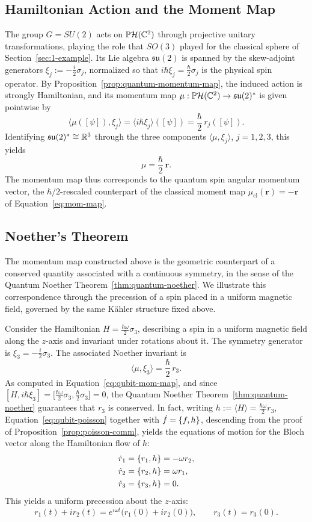 \subsection*{Hamiltonian Action and the Moment Map}

The group $G=SU(2)$ acts on $\PH(\C^2)$ through projective unitary transformations, playing the role that $SO(3)$ played for the classical sphere of Section~\ref{sec:1-example}. Its Lie algebra $\mathfrak{su}(2)$ is spanned by the skew-adjoint generators $\xi_j:=-\frac i2\sigma_j$, normalized so that $i\hbar\xi_j=\frac\hbar2\sigma_j$ is the physical spin operator. By Proposition~\ref{prop:quantum-momentum-map}, the induced action is strongly Hamiltonian, and its momentum map $\mu:\PH(\C^2)\to\mathfrak{su}(2)^*$ is given pointwise by
\[
\langle\mu([\psi]),\xi_j\rangle=\langle i\hbar\xi_j\rangle([\psi])=\frac\hbar2\,r_j([\psi]).
\]
Identifying $\mathfrak{su}(2)^*\cong\mathbb{R}^3$ through the three components $\langle\mu,\xi_j\rangle$, $j=1,2,3$, this yields
\begin{equation}
	\boxed{\mu=\frac\hbar2\,\mathbf r.} \label{eq:qubit-mom-map}
\end{equation}
The momentum map thus corresponds to the quantum spin angular momentum vector, the $\hbar/2$-rescaled counterpart of the classical moment map $\mu_{\mathrm{cl}}(\mathbf r)=-\mathbf r$ of Equation~\eqref{eq:mom-map}.

\subsection*{Noether's Theorem}

The momentum map constructed above is the geometric counterpart of a conserved quantity associated with a continuous symmetry, in the sense of the Quantum Noether Theorem~\ref{thm:quantum-noether}. We illustrate this correspondence through the precession of a spin placed in a uniform magnetic field, governed by the same Kähler structure fixed above.

Consider the Hamiltonian $H=\frac{\hbar\omega}2\sigma_3$, describing a spin in a uniform magnetic field along the $z$-axis and invariant under rotations about it. The symmetry generator is $\xi_3=-\frac i2\sigma_3$. The associated Noether invariant is
\[
\langle\mu,\xi_3\rangle=\frac\hbar2\,r_3.
\]
As computed in Equation~\eqref{eq:qubit-mom-map}, and since $[H,i\hbar\xi_3]=\big[\frac{\hbar\omega}2\sigma_3,\frac\hbar2\sigma_3\big]=0$, the Quantum Noether Theorem~\ref{thm:quantum-noether} guarantees that $r_3$ is conserved. In fact, writing $h:=\langle H\rangle=\frac{\hbar\omega}2r_3$, Equation~\eqref{eq:qubit-poisson} together with $\dot f=\{f,h\}$, descending from the proof of Proposition~\ref{prop:poisson-comm}, yields the equations of motion for the Bloch vector along the Hamiltonian flow of $h$:
\begin{align*}
	\dot r_1 &= \{r_1,h\} = -\omega r_2, \\
	\dot r_2 &= \{r_2,h\} = \omega r_1, \\
	\dot r_3 &= \{r_3,h\} = 0.
\end{align*}
This yields a uniform precession about the $z$-axis:
\[
r_1(t)+ir_2(t)=e^{i\omega t}\big(r_1(0)+ir_2(0)\big), \qquad r_3(t)=r_3(0).
\]
